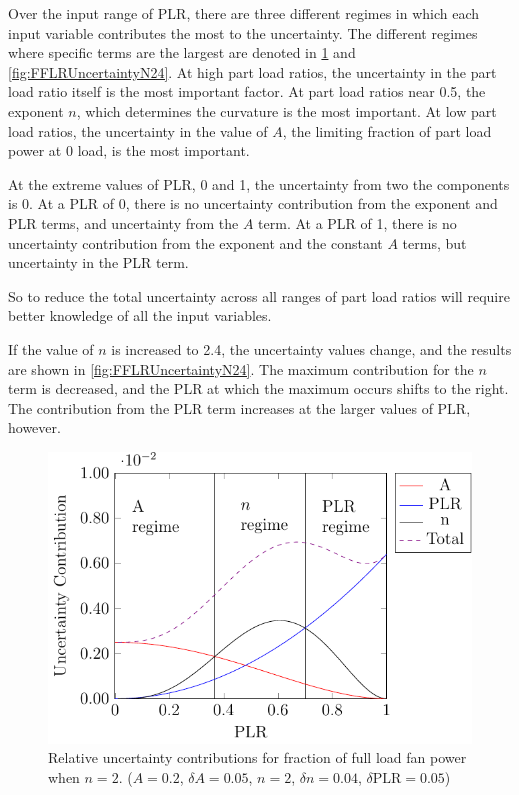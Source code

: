 Over the input range of PLR, there are three different regimes in which
each input variable contributes the most to the uncertainty. The
different regimes where specific terms are the largest are denoted in
\figref{} \ref{fig:FFLRUncertainty} and \ref{fig:FFLRUncertaintyN24}. At high
part load ratios, the uncertainty in the part load ratio itself is the
most important factor. At part load ratios near 0.5, the exponent \(n\),
which determines the curvature is the most important. At low part load
ratios, the uncertainty in the value of \(A\), the limiting fraction of
part load power at 0 load, is the most important.

At the extreme values of PLR, 0 and 1, the uncertainty from two the
components is 0. At a PLR of 0, there is no uncertainty contribution
from the exponent and PLR terms, and uncertainty from the \(A\) term. At
a PLR of 1, there is no uncertainty contribution from the exponent and
the constant \(A\) terms, but uncertainty in the PLR term. 

So to reduce the total uncertainty across all ranges of part load ratios
will require better knowledge of all the input variables.

If the value of \(n\) is increased to 2.4, the uncertainty values
change, and the results are shown in \figref{}
\ref{fig:FFLRUncertaintyN24}. The maximum contribution for the \(n\)
term is decreased, and the PLR at which the maximum occurs shifts to the
right. The contribution from the PLR term increases at the larger values
of PLR, however.

\begin{figure}
\centering
\includegraphics{Plots/2017-05-15-FFLPUncertainty.pdf}
\caption{Relative uncertainty contributions for fraction of full load
fan power when \(n=2\). (\(A=0.2\), \(\delta A = 0.05\), \(n=2\), \(\delta n =0.04\), \(\delta \text{PLR}=0.05\))}
\label{fig:FFLRUncertainty}
\end{figure}

